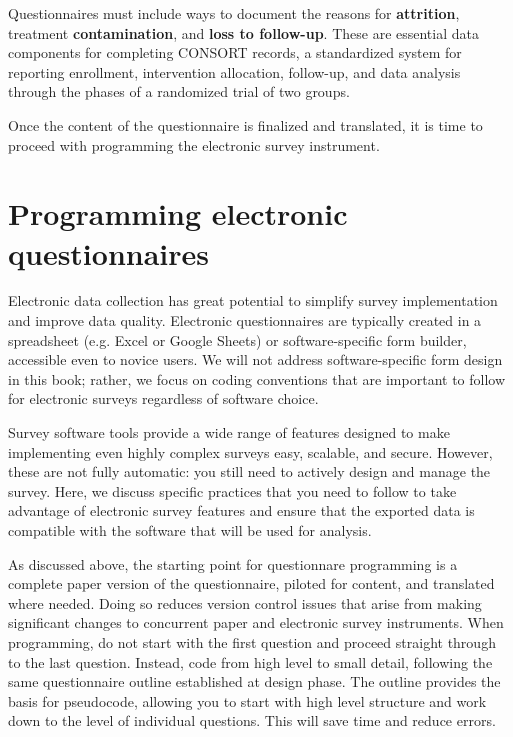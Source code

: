 Questionnaires must include ways to document the reasons for \textbf{attrition}, treatment \textbf{contamination}, and \textbf{loss to follow-up}.
These are essential data components for completing CONSORT records, a standardized system for reporting enrollment, intervention allocation, follow-up, and data analysis through the phases of a randomized trial of two groups.

Once the content of the questionnaire is finalized and translated, it is time to proceed with programming the electronic survey instrument.


\section{Programming electronic questionnaires}
Electronic data collection has great potential to simplify survey implementation and improve data quality.
Electronic questionnaires are typically created in a spreadsheet (e.g. Excel or Google Sheets) or software-specific form builder, accessible even to novice users.
We will not address software-specific form design in this book; rather, we focus on coding conventions that are important to follow for electronic surveys regardless of software choice.

Survey software tools provide a wide range of features designed to make implementing even highly complex surveys easy, scalable, and secure.
However, these are not fully automatic: you still need to actively design and manage the survey.
Here, we discuss specific practices that you need to follow to take advantage of electronic survey features and ensure that the exported data is compatible with the software that will be used for analysis.


As discussed above, the starting point for questionnare programming is a complete paper version of the questionnaire, piloted for content, and translated where needed.
Doing so reduces version control issues that arise from making significant changes to concurrent paper and electronic survey instruments.
When programming, do not start with the first question and proceed straight through to the last question.
Instead, code from high level to small detail, following the same questionnaire outline established at design phase.
The outline provides the basis for pseudocode, allowing you to start with high level structure and work down to the level of individual questions. This will save time and reduce errors.


